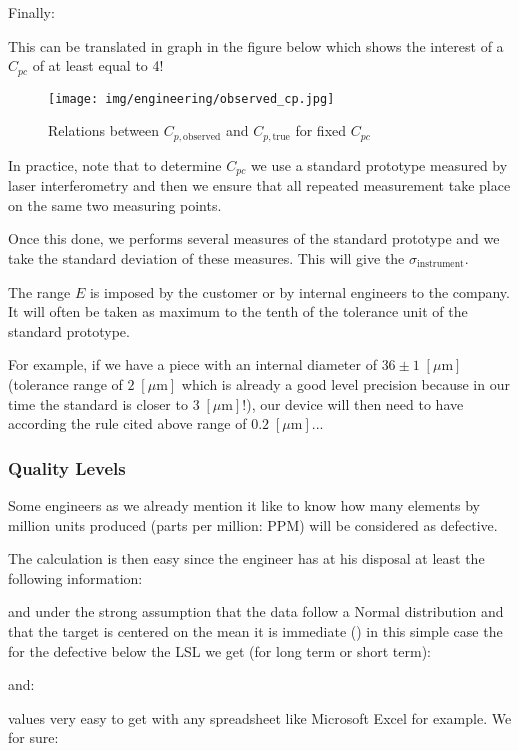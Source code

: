 	Finally:
	
	This can be translated in graph in the figure below which shows the interest of a $C_{pc}$ of at least equal to 4!
	
\begin{figure}[H]
\centering
\texttt{[image: img/engineering/observed\_cp.jpg]}
\caption{Relations between $C_{p,\text{observed}}$ and $C_{p,\text{true}}$ for fixed $C_{pc}$}
\end{figure}

	In practice, note that to determine $C_{pc}$ we use a standard prototype measured by laser interferometry and then we ensure that all repeated measurement take place on the same two measuring points.
	
	Once this done, we performs several measures of the standard prototype and we take the standard deviation of these measures. This will give the $\sigma_{\text{instrument}}$.
	
	The range $E$ is imposed by the customer or by internal engineers to the company. It will often be taken as maximum to the tenth of the tolerance unit of the standard prototype.
	
	For example, if we have a piece with an internal diameter of $36\pm 1\;[\mu \text{m}]$ (tolerance range of $2\; [\mu\text{m}]$ which is already a good level precision because in our time the standard is closer to $3\;[\mu\text{m}]$!), our device will then need to have according the rule cited above range of $0.2\;[\mu\text{m}]$...
	
	\pagebreak
	\subsubsection{Quality Levels}\label{quality levels}
	
	Some engineers as we already mention it like to know how many elements by million units produced (parts per million: PPM) will be considered as defective.
	
	The calculation is then easy since the engineer has at his disposal at least the following information:
	
	and under the strong assumption that the data follow a Normal distribution and that the target is centered on the mean it is immediate () in this simple case the for the defective below the LSL we get (for long term or short term):
	
	and:
	
	values very easy to get with any spreadsheet like Microsoft Excel for example.
	We for sure:
	
